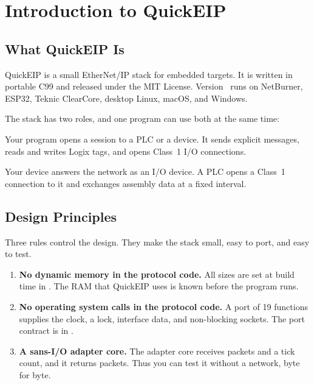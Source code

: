\chapter{Introduction to QuickEIP}\label{ch:intro}

\section{What QuickEIP Is}

QuickEIP is a small EtherNet/IP stack for embedded targets. It is written in
portable C99 and released under the MIT License. Version~\swversion{} runs on
NetBurner, ESP32, Teknic ClearCore, desktop Linux, macOS, and Windows.

The stack has two roles, and one program can use both at the same time:

\begin{description}[font=\sffamily\bfseries\color{navy}]
  \item[Scanner (originator)] Your program opens a session to a PLC or a
        device. It sends explicit messages, reads and writes Logix tags, and
        opens Class~1 I/O connections.
  \item[Adapter (target)] Your device answers the network as an I/O device.
        A PLC opens a Class~1 connection to it and exchanges assembly data at
        a fixed interval.
\end{description}

\section{Design Principles}

Three rules control the design. They make the stack small, easy to port, and
easy to test.

\begin{enumerate}
  \item \textbf{No dynamic memory in the protocol code.} All sizes are set at
        build time in . The RAM that QuickEIP uses
        is known before the program runs.
  \item \textbf{No operating system calls in the protocol code.} A port of 19
        functions supplies the clock, a lock, interface data, and
        non-blocking sockets. The port contract is in .
  \item \textbf{A sans-I/O adapter core.} The adapter core receives packets
        and a tick count, and it returns packets. Thus you can test it without
        a network, byte for byte.
\end{enumerate}

